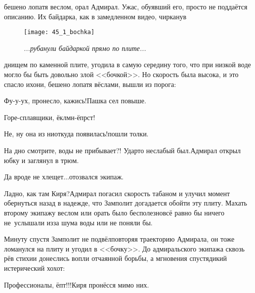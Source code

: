 
\mdash бешено лопатя веслом, орал Адмирал. Ужас, обуявший его, просто не поддаётся описанию. Их байдарка, как в замедленном видео, чирканув 

		\begin{figure}[h]
		\centering
		\texttt{[image: 45\_1\_bochka]}
		\caption{\small\textit{...рубанули байдаркой прямо по плите...}}
		\end{figure}

\noindent днищем по каменной плите, угодила в самую середину того, что при низкой воде могло бы быть довольно злой <<бочкой>>. Но скорость была высока, и это спасло их\mdash они, бешено лопатя вёслами, вышли из порога:%

\diagdash Фу-у-ух, пронесло, кажись!\mdash Пашка сел повыше.

\diagdash Горе-сплавщики, ёклмн-ёпрст!

\diagdash Не, ну она из ниоткуда появилась!\mdash пошли толки.

\diagdash На дно смотрите, воды не прибывает?! Удар\sdash то неслабый был.\mdash Адмирал открыл юбку и заглянул в трюм.%

\diagdash Да вроде не хлещет$\ldots$\mdash отозвался экипаж.

\diagdash Ладно, как там Киря?\mdash Адмирал погасил скорость табаном и улучил момент обернуться назад в надежде, что Замполит догадается обойти эту плиту. Махать второму экипажу веслом или орать было бесполезно\mdash всё равно бы ничего не~услышали из\sdash за шума воды или не поняли бы. 

Минуту спустя Замполит не подвёл\mdash повторяя траекторию Адмирала, он тоже ломанулся на плиту и угодил в <<бочку>>. До адмиральского экипажа сквозь рёв стихии донеслись вопли отчаянной борьбы, а мгновения спустя\mdash дикий истерический хохот:

\diagdash Профессионалы, ёпт!!!\mdash Киря пронёсся мимо них.

